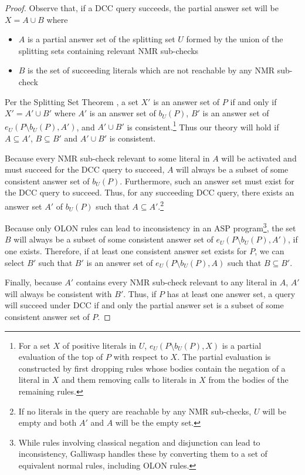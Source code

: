 \documentclass{new_tlp}
\begin{document}
\begin{proof}
Observe that, if a DCC query succeeds, the partial answer set will be 
$X = A \cup B$ where
\begin{itemize}
\item $A$ is a partial answer set of the splitting set $U$ formed by the union
	of the splitting sets containing relevant NMR sub-checks
\item $B$ is the set of succeeding literals which are not reachable by any NMR
	sub-check
\end{itemize}

\noindent Per the Splitting Set Theorem \cite{splitting}, a set $X'$ is an 
answer set of $P$ if and only if $X' = A' \cup B'$ where $A'$ is an answer set
of $b_{U}(P)$, $B'$ is an answer set of $e_U(P \setminus b_{U}(P), A')$, and
$A' \cup B'$ is consistent.\footnote{For a set $X$ of positive literals in $U$,
$e_U(P \setminus b_{U}(P), X)$ is a partial evaluation of the top of $P$ with
respect to $X$. The partial evaluation is constructed by first dropping rules
whose bodies contain the negation of a literal in $X$ and them removing calls
to literals in $X$ from the bodies of the remaining rules.} Thus our theory
will hold if $A \subseteq A'$, $B \subseteq B'$ and $A' \cup B'$ is consistent.

Because every NMR sub-check relevant to some literal in $A$ will be activated 
and must succeed for the DCC query to succeed, $A$ will always be a subset of 
some consistent answer set of $b_{U}(P)$. Furthermore, such an answer set must
exist for the DCC query to succeed. Thus, for any succeeding DCC query, there
exists an answer set $A'$ of $b_{U}(P)$ such that $A \subseteq A'$.\footnote{If
no literals in the query are reachable by any NMR sub-checks, $U$ will be empty
and both $A'$ and $A$ will be the empty set.}

Because only OLON rules can lead to inconsistency in an ASP
program\footnote{While rules involving classical negation and disjunction can
lead to inconsistency, Galliwasp handles these by converting them to a set of
equivalent normal rules, including OLON rules.}, the set $B$ will always be a
subset of some consistent answer set of $e_U(P \setminus b_{U}(P), A')$, if one
exists. Therefore, if at least one consistent answer set exists for $P$, we can
select $B'$ such that $B'$ is an answer set of $e_U(P \setminus b_{U}(P), A)$ 
such that $B \subseteq B'$.

Finally, because $A'$ contains every NMR sub-check relevant to any literal in
$A$, $A'$ will always be consistent with $B'$. Thus, if $P$ has at least one
answer set, a query will succeed under DCC if and only the partial answer set
is a subset of some consistent answer set of $P$.
\end{proof}
\end{document}
